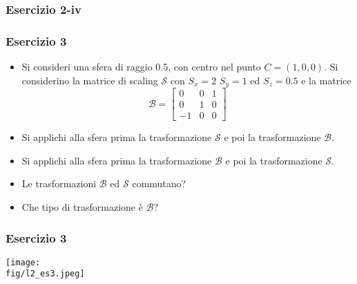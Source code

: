 \documentclass{beamer}
\newcommand{\fig}{figures} %
\begin{document}
\begin{frame}
\frametitle{Esercizio 2-iv}
\begin{center}
\end{center}
\end{frame}
\begin{frame}
\frametitle{Esercizio 3}
\begin{itemize}
\item Si consideri una sfera di raggio 0.5, con centro nel punto $C=(1,0,0)$. Si
considerino la matrice di scaling $\mathcal{S}$ con $S_x=2$ $S_y=1$ ed $S_z =0.5$ e la matrice 
\begin{displaymath}
\mathcal{B} =  \begin{bmatrix}
                0 & 0 & 1\\
                0  & 1 & 0\\
                -1 & 0 & 0
                \end{bmatrix}
\end{displaymath}
\item Si applichi alla sfera prima la trasformazione $\mathcal{S}$ e poi la trasformazione $\mathcal{B}$.
\item Si applichi alla sfera prima la trasformazione $\mathcal{B}$ e poi la trasformazione $\mathcal{S}$.
\item Le trasformazioni $\mathcal{B}$ ed $\mathcal{S}$ commutano?
\item Che tipo di trasformazione \`e $\mathcal{B}$?
\end{itemize}
\end{frame}
\begin{frame}
\frametitle{Esercizio 3}
\texttt{[image: \\fig/l2\_es3.jpeg]}
\end{frame}
%
\end{document}
